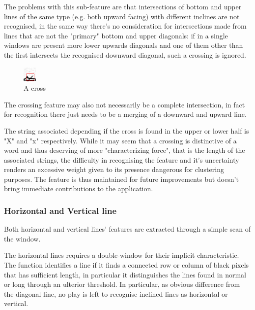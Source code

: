 The problems with this sub-feature are that intersections of bottom and upper lines of the same type (e.g. both upward facing) with different inclines are not recognised, in the same way there's no consideration for intersections made from lines that are not the "primary" bottom and upper diagonals: if in a single windows are present more lower upwards diagonals and one of them other than the first intersects the recognised downward diagonal, such a crossing is ignored.

\begin{figure}
  \vspace{-20pt}
  \begin{center}
    \includegraphics[width=0.06\textwidth]{images/cross.jpg}
  \end{center}
  \vspace{-20pt}
  \caption{A cross}
  \vspace{-10pt}
\end{figure}


The crossing feature may also not necessarily be a complete intersection, in fact for recognition there just needs to be a merging of a downward and upward line. 

The string associated depending if the cross is found in the upper or lower half is "X" and "x" respectively.
While it may seem that a crossing is distinctive of a word and thus deserving of more "characterizing force", that is the length of the associated strings, the difficulty in recognising the feature and it's uncertainty renders an excessive weight given to its presence dangerous for clustering purposes.
The feature is thus maintained for future improvements but doesn't bring immediate 
contributions to the application.

\subsubsection{Horizontal and Vertical line}
Both horizontal and vertical lines' features are extracted through
a simple scan of the window.

The horizontal lines requires a double-window for their implicit characteristic.
The function identifies a line if it finds a connected row or column of black pixels that has sufficient length, in particular it distinguishes the lines found in normal or long through an ulterior threshold.
In particular, as obvious difference from the diagonal line, no play is left to recognise inclined lines as horizontal or vertical.

